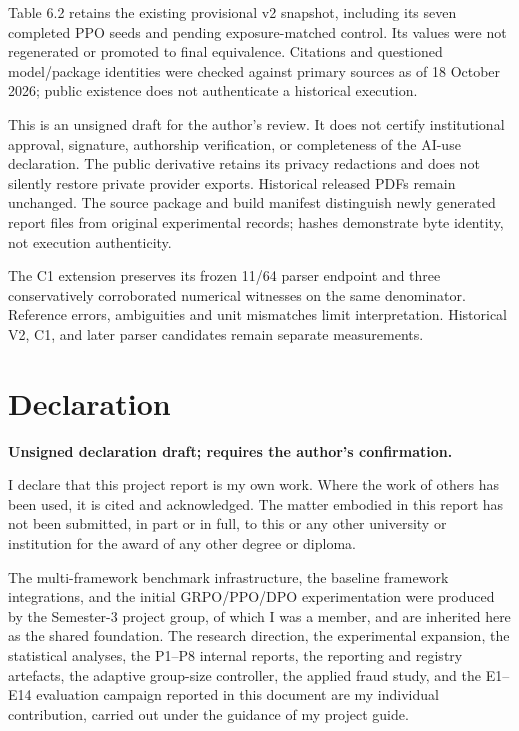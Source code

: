 \documentclass[12pt,a4paper]{report}
\begin{document}
Table 6.2 retains the existing provisional v2 snapshot, including its seven completed PPO seeds and pending exposure-matched control. Its values were not regenerated or promoted to final equivalence. Citations and questioned model/package identities were checked against primary sources as of 18 October 2026; public existence does not authenticate a historical execution.

This is an unsigned draft for the author's review. It does not certify institutional approval, signature, authorship verification, or completeness of the AI-use declaration. The public derivative retains its privacy redactions and does not silently restore private provider exports. Historical released PDFs remain unchanged. The source package and build manifest distinguish newly generated report files from original experimental records; hashes demonstrate byte identity, not execution authenticity.

The C1 extension preserves its frozen 11/64 parser endpoint and three conservatively corroborated numerical witnesses on the same denominator. Reference errors, ambiguities and unit mismatches limit interpretation. Historical V2, C1, and later parser candidates remain separate measurements.

\chapter*{Declaration}
\thispagestyle{plain}
\textbf{Unsigned declaration draft; requires the author's confirmation.}

I declare that this project report is my own work. Where the work of others has
been used, it is cited and acknowledged. The matter embodied in this report has
not been submitted, in part or in full, to this or any other university or
institution for the award of any other degree or diploma.

The multi-framework benchmark infrastructure, the baseline framework
integrations, and the initial GRPO/PPO/DPO experimentation were produced by the
Semester-3 project group, of which I was a member, and are inherited here as
the shared foundation. The research direction, the experimental expansion, the
statistical analyses, the P1--P8 internal reports, the reporting and registry
artefacts, the adaptive group-size controller, the applied fraud study, and the
E1--E14 evaluation campaign reported in this document are my
individual contribution, carried out under the guidance of my project guide.
\end{document}
